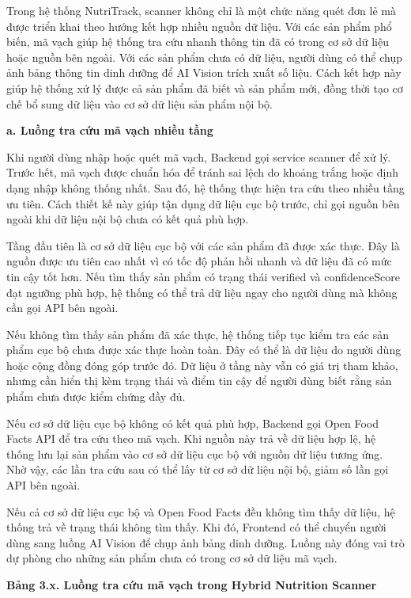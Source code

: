 Trong hệ thống NutriTrack, scanner không chỉ là một chức năng quét đơn lẻ mà được triển khai theo hướng kết hợp nhiều nguồn dữ liệu. Với các sản phẩm phổ biến, mã vạch giúp hệ thống tra cứu nhanh thông tin đã có trong cơ sở dữ liệu hoặc nguồn bên ngoài. Với các sản phẩm chưa có dữ liệu, người dùng có thể chụp ảnh bảng thông tin dinh dưỡng để AI Vision trích xuất số liệu. Cách kết hợp này giúp hệ thống xử lý được cả sản phẩm đã biết và sản phẩm mới, đồng thời tạo cơ chế bổ sung dữ liệu vào cơ sở dữ liệu sản phẩm nội bộ.

\textbf{a. Luồng tra cứu mã vạch nhiều tầng}

Khi người dùng nhập hoặc quét mã vạch, Backend gọi service scanner để xử lý. Trước hết, mã vạch được chuẩn hóa để tránh sai lệch do khoảng trắng hoặc định dạng nhập không thống nhất. Sau đó, hệ thống thực hiện tra cứu theo nhiều tầng ưu tiên. Cách thiết kế này giúp tận dụng dữ liệu cục bộ trước, chỉ gọi nguồn bên ngoài khi dữ liệu nội bộ chưa có kết quả phù hợp.

Tầng đầu tiên là cơ sở dữ liệu cục bộ với các sản phẩm đã được xác thực. Đây là nguồn được ưu tiên cao nhất vì có tốc độ phản hồi nhanh và dữ liệu đã có mức tin cậy tốt hơn. Nếu tìm thấy sản phẩm có trạng thái verified và confidenceScore đạt ngưỡng phù hợp, hệ thống có thể trả dữ liệu ngay cho người dùng mà không cần gọi API bên ngoài.

Nếu không tìm thấy sản phẩm đã xác thực, hệ thống tiếp tục kiểm tra các sản phẩm cục bộ chưa được xác thực hoàn toàn. Đây có thể là dữ liệu do người dùng hoặc cộng đồng đóng góp trước đó. Dữ liệu ở tầng này vẫn có giá trị tham khảo, nhưng cần hiển thị kèm trạng thái và điểm tin cậy để người dùng biết rằng sản phẩm chưa được kiểm chứng đầy đủ.

Nếu cơ sở dữ liệu cục bộ không có kết quả phù hợp, Backend gọi Open Food Facts API để tra cứu theo mã vạch. Khi nguồn này trả về dữ liệu hợp lệ, hệ thống lưu lại sản phẩm vào cơ sở dữ liệu cục bộ với nguồn dữ liệu tương ứng. Nhờ vậy, các lần tra cứu sau có thể lấy từ cơ sở dữ liệu nội bộ, giảm số lần gọi API bên ngoài.

Nếu cả cơ sở dữ liệu cục bộ và Open Food Facts đều không tìm thấy dữ liệu, hệ thống trả về trạng thái không tìm thấy. Khi đó, Frontend có thể chuyển người dùng sang luồng AI Vision để chụp ảnh bảng dinh dưỡng. Luồng này đóng vai trò dự phòng cho những sản phẩm chưa có trong cơ sở dữ liệu mã vạch.

\textbf{Bảng 3.x. Luồng tra cứu mã vạch trong Hybrid Nutrition Scanner}

